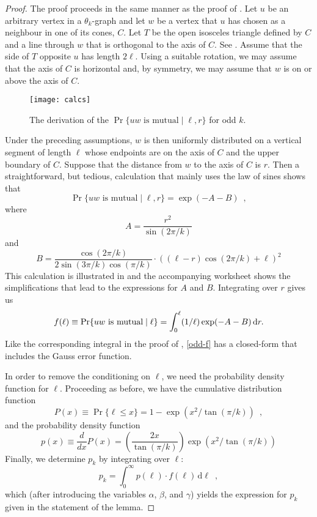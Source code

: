 \documentclass[twoside,leqno,twocolumn]{article}
\begin{document}
\begin{proof}
  The proof proceeds in the same manner as the proof of .
  Let $u$ be an arbitrary vertex in a $\theta_k$-graph and let $w$ be
  a vertex that $u$ has chosen as a neighbour in one of its cones, $C$.
  Let $T$ be the open isosceles triangle defined by $C$ and a line through
  $w$ that is orthogonal to the axis of $C$. See .
  Assume that the side of $T$ opposite $u$ has length $2\ell$.  Using a
  suitable rotation, we may assume that the axis of $C$ is horizontal and,
  by symmetry, we may assume that $w$ is on or above the axis of $C$.
 
  \begin{figure*}
    \texttt{[image: calcs]}
    \caption{The derivation of the $\Pr\{\mbox{$uw$ is mutual}\mid \ell,r\}$
             for odd $k$.}
  \end{figure*}
  Under the preceding assumptions, $w$ is then uniformly distributed on
  a vertical segment of length $\ell$ whose endpoints are on the axis
  of $C$ and the upper boundary of $C$.  Suppose that the distance from
  $w$ to the axis of $C$ is $r$.  Then a straightforward, but tedious,
  calculation that mainly uses the law of sines shows that
  \[
      \Pr\{\mbox{$uw$ is mutual}\mid \ell, r\} = \exp(-A-B) \enspace ,
  \]
  where
  \[ 
      A = \frac{r^2}{\sin(2\pi/k)}
  \]
  and
  \[
      B = \frac{\cos(2\pi/k)}{2\sin(3\pi/k)\cos(\pi/k)}\cdot\left((\ell-r)\cos(2\pi/k)+\ell\right)^2
  \]
  This calculation is illustrated in  and the
  accompanying worksheet shows the simplifications that lead to the
  expressions for $A$ and $B$.  Integrating over $r$ gives us
  \begin{equation}
    f(\ell)\equiv \Pr\{\mbox{$uw$ is mutual}\mid \ell\} = 
      \int_0^\ell (1/\ell)\exp(-A-B)\,\mathrm{d}r . \eqlabel{odd-f}
  \end{equation}
  Like the corresponding integral in the proof of ,
  \eqref{odd-f} has a closed-form that includes the Gauss error function.

  In order to remove the conditioning on $\ell$, we need the probability
  density function for $\ell$.  Proceeding as before, we have the
  cumulative distribution function
  \[
     P(x) \equiv \Pr\{\ell\le x\} 
          = 1 - \exp(x^2/\tan(\pi/k)) \enspace ,
  \]
  and the probability density function
  \[
    p(x)\equiv \frac{d}{dx}P(x) = 
     \left(\frac{2x}{\tan(\pi/k)}\right)
      \exp(x^2/\tan(\pi/k))
  \]
  Finally, we determine $p_k$ by integrating over $\ell$:
  \[
     p_k = \int_0^\infty p(\ell)\cdot f(\ell)\, \mathrm{d}{\ell} \enspace ,
  \]
  which (after introducing the variables $\alpha$, $\beta$, and $\gamma$)
  yields the expression for $p_k$ given in the statement of the lemma.
\end{proof}
\end{document}
